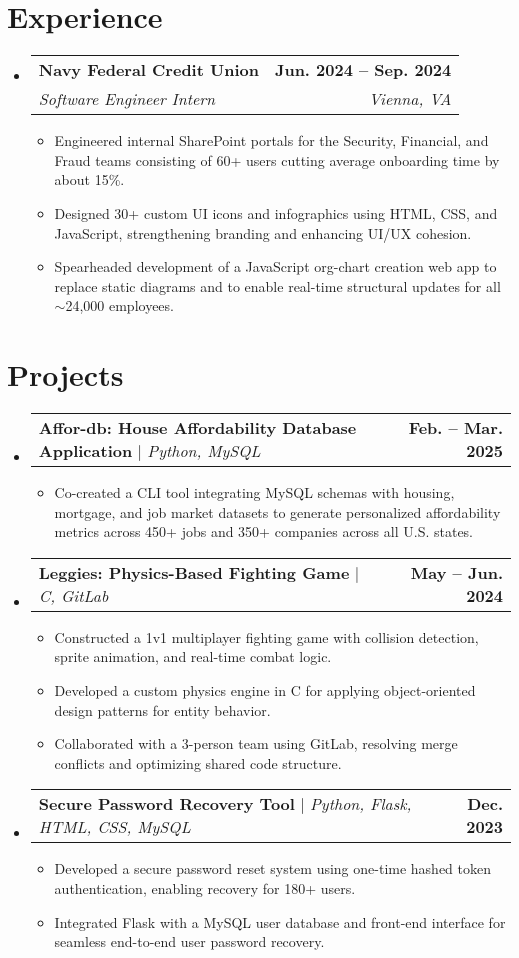 \documentclass[letterpaper,11pt]{article}
\makeatletter
\newcommand{\resumeItem}[1]{
  \item\normalsize{
    {#1 \vspace{-2pt}}
  }
}
\newcommand{\resumeSubheading}[4]{
  \vspace{-2pt}\item
    \begin{tabular*}{1.0\textwidth}[t]{l@{\extracolsep{\fill}}r}
      \textbf{#1} & \textbf{\small #2} \\
      \textit{\small#3} & \textit{\small #4} \\
    \end{tabular*}\vspace{-7pt}
}
\newcommand{\resumeProjectHeading}[2]{
    \item
    \begin{tabular*}{1.001\textwidth}{l@{\extracolsep{\fill}}r}
      \small#1 & \textbf{\small #2}\\
    \end{tabular*}\vspace{-7pt}
}
\newcommand{\resumeSubHeadingListStart}{\begin{itemize}[leftmargin=0.0in, label={}]}
\newcommand{\resumeSubHeadingListEnd}{\end{itemize}}
\newcommand{\resumeItemListStart}{\begin{itemize}}
\newcommand{\resumeItemListEnd}{\end{itemize}\vspace{-5pt}}
\makeatother
\begin{document}
\section{Experience}
  \resumeSubHeadingListStart

    \resumeSubheading
      {Navy Federal Credit Union}{Jun. 2024 -- Sep. 2024}
      {Software Engineer Intern}{Vienna, VA}
      \resumeItemListStart
        \resumeItem{Engineered internal SharePoint portals for the Security, Financial, and Fraud teams consisting of 60+ users cutting average onboarding time by about 15\%.}
        \resumeItem{Designed 30+ custom UI icons and infographics using HTML, CSS, and JavaScript, strengthening branding and enhancing UI/UX cohesion.}
        \resumeItem{Spearheaded development of a JavaScript org-chart creation web app to replace static diagrams and to enable real-time structural updates for all $\sim$24,000 employees.}
      \resumeItemListEnd
    
  \resumeSubHeadingListEnd
\vspace{-16pt}

\section{Projects}
    \vspace{-7pt}
    \resumeSubHeadingListStart
      \resumeProjectHeading
          {\textbf{Affor-db: House Affordability Database Application} $|$ \emph{Python, MySQL}}{Feb. -- Mar. 2025}
          \resumeItemListStart
            \resumeItem{Co-created a CLI tool integrating MySQL schemas with housing, mortgage, and job market datasets to generate personalized affordability metrics across 450+ jobs and 350+ companies across all U.S. states.}
            \vspace{-18pt}
          \resumeItemListEnd
      \resumeProjectHeading
          {\textbf{Leggies: Physics-Based Fighting Game} $|$ \emph{C, GitLab}}{May -- Jun. 2024}
          \resumeItemListStart
            \resumeItem{Constructed a 1v1 multiplayer fighting game with collision detection, sprite animation, and real-time combat logic.}
            \resumeItem{Developed a custom physics engine in C for applying object-oriented design patterns for entity behavior.}  
            \resumeItem{Collaborated with a 3-person team using GitLab, resolving merge conflicts and optimizing shared code structure.}
          \resumeItemListEnd
          \vspace{-18pt}
      \resumeProjectHeading
          {\textbf{Secure Password Recovery Tool} $|$ \emph{Python, Flask, HTML, CSS, MySQL}}{Dec. 2023}
          \resumeItemListStart
            \resumeItem{Developed a secure password reset system using one-time hashed token authentication, enabling recovery for 180+ users.}
            \resumeItem{Integrated Flask with a MySQL user database and front-end interface for seamless end-to-end user password recovery.}
          \resumeItemListEnd 
    \resumeSubHeadingListEnd
\vspace{-15.5pt}
\end{document}
